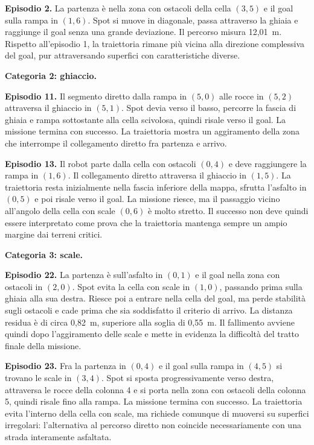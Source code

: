 \documentclass[11pt,a4paper]{article}
\begin{document}
\textbf{Episodio 2.} La partenza è nella zona con ostacoli della cella $(3,5)$ e il goal sulla rampa in $(1,6)$. Spot si muove in diagonale, passa attraverso la ghiaia e raggiunge il goal senza una grande deviazione. Il percorso misura 12,01~m. Rispetto all'episodio 1, la traiettoria rimane più vicina alla direzione complessiva del goal, pur attraversando superfici con caratteristiche diverse.

\textbf{Categoria 2: ghiaccio.}

\textbf{Episodio 11.} Il segmento diretto dalla rampa in $(5,0)$ alle rocce in $(5,2)$ attraversa il ghiaccio in $(5,1)$. Spot devia verso il basso, percorre la fascia di ghiaia e rampa sottostante alla cella scivolosa, quindi risale verso il goal. La missione termina con successo. La traiettoria mostra un aggiramento della zona che interrompe il collegamento diretto fra partenza e arrivo.

\textbf{Episodio 13.} Il robot parte dalla cella con ostacoli $(0,4)$ e deve raggiungere la rampa in $(1,6)$. Il collegamento diretto attraversa il ghiaccio in $(1,5)$. La traiettoria resta inizialmente nella fascia inferiore della mappa, sfrutta l'asfalto in $(0,5)$ e poi risale verso il goal. La missione riesce, ma il passaggio vicino all'angolo della cella con scale $(0,6)$ è molto stretto. Il successo non deve quindi essere interpretato come prova che la traiettoria mantenga sempre un ampio margine dai terreni critici.

\textbf{Categoria 3: scale.}

\textbf{Episodio 22.} La partenza è sull'asfalto in $(0,1)$ e il goal nella zona con ostacoli in $(2,0)$. Spot evita la cella con scale in $(1,0)$, passando prima sulla ghiaia alla sua destra. Riesce poi a entrare nella cella del goal, ma perde stabilità sugli ostacoli e cade prima che sia soddisfatto il criterio di arrivo. La distanza residua è di circa 0,82~m, superiore alla soglia di 0,55~m. Il fallimento avviene quindi dopo l'aggiramento delle scale e mette in evidenza la difficoltà del tratto finale della missione.

\textbf{Episodio 23.} Fra la partenza in $(0,4)$ e il goal sulla rampa in $(4,5)$ si trovano le scale in $(3,4)$. Spot si sposta progressivamente verso destra, attraversa le rocce della colonna 4 e si porta nella zona con ostacoli della colonna 5, quindi risale fino alla rampa. La missione termina con successo. La traiettoria evita l'interno della cella con scale, ma richiede comunque di muoversi su superfici irregolari: l'alternativa al percorso diretto non coincide necessariamente con una strada interamente asfaltata.
\end{document}

